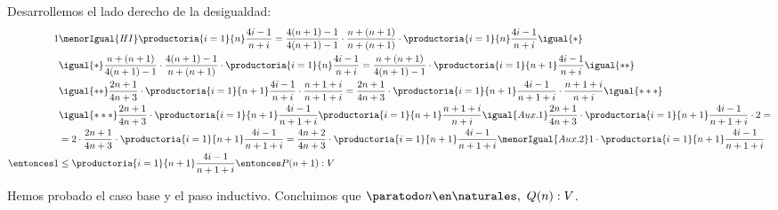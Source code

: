 \begin{enumerate}[label=\roman*)]
\begin{enumerate}[label=\arabic*)]
                Desarrollemos el lado derecho de la desigualdad:
                \begin{align*}
                  1           & \menorIgual{HI} \productoria{i=1}{n} \frac{4i-1}{n+i} = \frac{4(n+1)-1}{4(n+1)-1} \cdot
                  \frac{n + (n+1)}{n + (n+1)} \cdot \productoria{i=1}{n} \frac{4i-1}{n+i} \igual{*}                                   \\
                              & \igual{*}\frac{n+(n+1)}{4(n+1)-1} \cdot
                  \frac{4(n+1)-1}{n+(n+1)} \cdot \productoria{i=1}{n} \frac{4i-1}{n+i} = \frac{n+(n+1)}{4(n+1)-1} \cdot
                  \productoria{i=1}{n+1} \frac{4i-1}{n+i} \igual{**}                                                                  \\
                              & \igual{**} \frac{2n+1}{4n+3} \cdot \productoria{i=1}{n+1} \frac{4i-1}{n+i} \cdot \frac{n+1+i}{n+1+i}
                  = \frac{2n+1}{4n+3} \cdot \productoria{i=1}{n+1} \frac{4i-1}{n+1+i} \cdot \frac{n+1+i}{n+i} \igual{***}             \\
                              & \igual{***} \frac{2n+1}{4n+3} \cdot \productoria{i=1}{n+1} \frac{4i-1}{n+1+i}
                  \productoria{i=1}{n+1}  \frac{n+1+i}{n+i} \igual{\tiny Aux.1} \frac{2n+1}{4n+3} \cdot
                  \productoria{i=1}{n+1} \frac{4i-1}{n+1+i} \cdot 2 =                                                                 \\
                              & = 2 \cdot \frac{2n+1}{4n+3} \cdot \productoria{i=1}{n+1} \frac{4i-1}{n+1+i} = \frac{4n+2}{4n+3} \cdot
                  \productoria{i=1}{n+1} \frac{4i-1}{n+1+i} \menorIgual{\tiny Aux.2} 1 \cdot
                  \productoria{i=1}{n+1} \frac{4i-1}{n+1+i}                                                                           \\
                  \entonces 1 & \leq \productoria{i=1}{n+1} \frac{4i-1}{n+1+i} \entonces P(n+1):V
                \end{align*}
        \end{enumerate}

        Hemos probado el caso base y el paso inductivo. Concluimos que $\paratodo n \en \naturales, \ Q(n): V$.


\end{enumerate}
